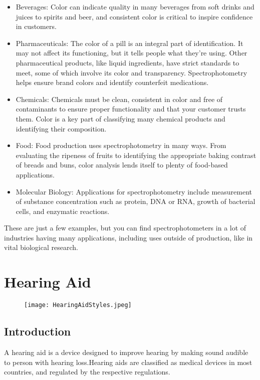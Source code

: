 \documentclass[12pt]{article}
\begin{document}
\begin{itemize}
  \item Beverages: Color can indicate quality in many beverages from soft drinks and juices to spirits and beer, and consistent color is critical to inspire confidence in customers.
  \item Pharmaceuticals: The color of a pill is an integral part of identification. It may not affect its functioning, but it tells people what they’re using. Other pharmaceutical products, like liquid ingredients, have strict standards to meet, some of which involve its color and transparency. Spectrophotometry helps ensure brand colors and identify counterfeit medications.
  \item Chemicals: Chemicals must be clean, consistent in color and free of contaminants to ensure proper functionality and that your customer trusts them. Color is a key part of classifying many chemical products and identifying their composition.
  \item Food: Food production uses spectrophotometry in many ways. From evaluating the ripeness of fruits to identifying the appropriate baking contrast of breads and buns, color analysis lends itself to plenty of food-based applications.
  \item Molecular Biology: Applications for spectrophotometry include measurement of substance concentration such as protein, DNA or RNA, growth of bacterial cells, and enzymatic reactions.
 \end{itemize}
These are just a few examples, but you can find spectrophotometers in a lot of industries having many applications, including uses outside of production, like in vital biological research. 


\section{Hearing Aid}

\begin{figure}[H]
\texttt{[image: HearingAidStyles.jpeg]}
\centering
\end{figure}

\subsection{Introduction}

A hearing aid is a device designed to improve hearing by making sound audible to person with hearing loss.Hearing aids are classified as medical devices in most countries, and regulated by the respective regulations.
\end{document}
